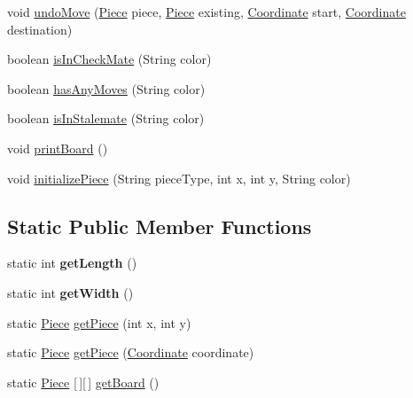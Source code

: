 \begin{DoxyCompactItemize}
void \hyperlink{classmain_1_1model_1_1_board_a6d983017a927def6bf7263b8a50c293a}{undo\+Move} (\hyperlink{classmain_1_1pieces_1_1_piece}{Piece} piece, \hyperlink{classmain_1_1pieces_1_1_piece}{Piece} existing, \hyperlink{classmain_1_1model_1_1_coordinate}{Coordinate} start, \hyperlink{classmain_1_1model_1_1_coordinate}{Coordinate} destination)
\item 
boolean \hyperlink{classmain_1_1model_1_1_board_abb5dfd9e2e597dd686351c1f06fbcb38}{is\+In\+Check\+Mate} (String color)
\item 
boolean \hyperlink{classmain_1_1model_1_1_board_aa3457acaf5b59679081273fc1e683be5}{has\+Any\+Moves} (String color)
\item 
boolean \hyperlink{classmain_1_1model_1_1_board_a6c144f940cc67d3f2f648f7fcc58294b}{is\+In\+Stalemate} (String color)
\item 
void \hyperlink{classmain_1_1model_1_1_board_ae838db532812c97d60e76ecd58027cc9}{print\+Board} ()
\item 
void \hyperlink{classmain_1_1model_1_1_board_ab822fe6d82c7951dbf950a6df4ee8b85}{initialize\+Piece} (String piece\+Type, int x, int y, String color)
\end{DoxyCompactItemize}
\subsection*{Static Public Member Functions}
\begin{DoxyCompactItemize}
\item 
\hypertarget{classmain_1_1model_1_1_board_a537a632327e7e27f10edcc2abe41de9f}{}\label{classmain_1_1model_1_1_board_a537a632327e7e27f10edcc2abe41de9f} 
static int {\bfseries get\+Length} ()
\item 
\hypertarget{classmain_1_1model_1_1_board_a00371e25d2973e637da7a768d1e2551a}{}\label{classmain_1_1model_1_1_board_a00371e25d2973e637da7a768d1e2551a} 
static int {\bfseries get\+Width} ()
\item 
static \hyperlink{classmain_1_1pieces_1_1_piece}{Piece} \hyperlink{classmain_1_1model_1_1_board_a9be517cf5bb1584069e14d202b4d708b}{get\+Piece} (int x, int y)
\item 
static \hyperlink{classmain_1_1pieces_1_1_piece}{Piece} \hyperlink{classmain_1_1model_1_1_board_acf3676f6e319705c9ed713d1c9fd097a}{get\+Piece} (\hyperlink{classmain_1_1model_1_1_coordinate}{Coordinate} coordinate)
\item 
static \hyperlink{classmain_1_1pieces_1_1_piece}{Piece} \mbox{[}$\,$\mbox{]}\mbox{[}$\,$\mbox{]} \hyperlink{classmain_1_1model_1_1_board_af7321b4ae3a390e48d3dd6c188de5d2e}{get\+Board} ()
\end{DoxyCompactItemize}


